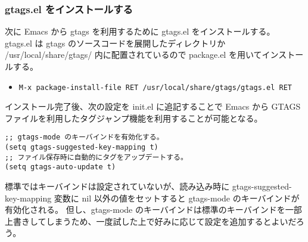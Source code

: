 \subsubsection{gtags.el をインストールする}
次に Emacs から gtags を利用するために gtags.el をインストールする。
gtags.el は gtags のソースコードを展開したディレクトリか /usr/local/share/gtags/ 内に配置されているので package.el を用いてインストールする。
\begin{itemize}\setlength{\leftskip}{-1.00zw}%
\item[] \texttt{M-x package-install-file RET /usr/local/share/gtags/gtags.el RET}
\end{itemize}
インストール完了後、次の設定を init.el に追記することで Emacs から GTAGS ファイルを利用したタグジャンプ機能を利用することが可能となる。
\begin{mdframed}[roundcorner=0.50zw,leftmargin=3.00zw,rightmargin=3.00zw,skipabove=0.40zw,skipbelow=0.40zw,innertopmargin=4.00pt,innerbottommargin=4.00pt,innerleftmargin=5.00pt,innerrightmargin=5.00pt,linecolor=gray!020,linewidth=0.50pt,backgroundcolor=gray!20]
\begin{verbatim}
;; gtags-mode のキーバインドを有効化する。
(setq gtags-suggested-key-mapping t)
;; ファイル保存時に自動的にタグをアップデートする。
(setq gtags-auto-update t)
\end{verbatim}
\end{mdframed}
標準ではキーバインドは設定されていないが、読み込み時に gtags-suggested-key-mapping 変数に nil 以外の値をセットすると gtags-mode のキーバインドが有効化される。
但し、gtags-mode のキーバインドは標準のキーバインドを一部上書きしてしまうため、一度試した上で好みに応じて設定を追加するとよいだろう。
